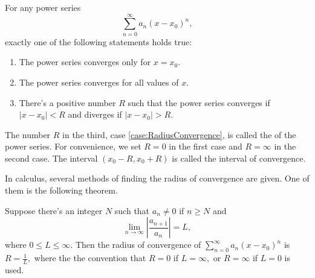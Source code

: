 \begin{theorem}
For any power series
\[\sum_{n=0}^\infty a_n(x-x_0)^n,\]
exactly one of the following statements holds true:
\begin{enumerate}
  \item 
  The power series converges only for $x=x_0.$
  \item 
  The power series converges for all values of $x.$
  \item \label{case:RadiusConvergence}
  There's a positive number $R$ such that the power series converges if $|x-x_0|<R$ and diverges if $|x-x_0|>R$.
\end{enumerate}
\end{theorem}

The number $R$ in the third, case \ref{case:RadiusConvergence}, is called the  of the power series. For convenience, we set $R=0$ in the first case and $R=\infty$ in the second case.  The interval $(x_0-R, x_0+R)$ is called the interval of convergence.

In calculus, several methods of finding the radius of convergence are given. One of them is the following theorem.
\begin{theorem}
  Suppose there's an integer $N$ such that $a_n\ne 0$ if $n\ge N$ and
  \[\lim_{n\to\infty}\left|\frac{a_{n+1}}{a_n}\right|=L,\]
  where $0\le L\le\infty.$ 
  Then the radius of convergence of $\sum_{n=0}^\infty a_n(x-x_0)^n$ is $R=\frac1L,$ where the the convention that $R=0$ if $L=\infty,$ or $R=\infty$ if $L=0$ is used.
\end{theorem}

